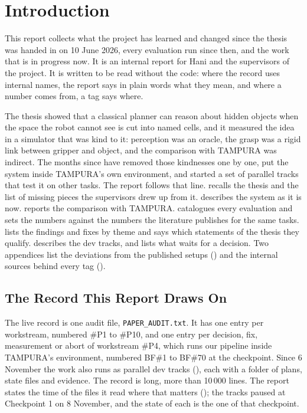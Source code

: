 
\chapter{Introduction}
\label{ch:introduction}

This report collects what the project has learned and changed since the thesis
\cite{alassiri2026thesis} was handed in on 10 June 2026, every evaluation run
since then, and the work that is in progress now. It is an internal report for
Hani and the supervisors of the project. It is written to be read without the code: where the
record uses internal names, the report says in plain words what they mean, and
where a number comes from, a tag says where.

The thesis showed that a classical planner can reason about hidden objects when
the space the robot cannot see is cut into named cells, and it measured the
idea in a simulator that was kind to it: perception was an oracle, the grasp was
a rigid link between gripper and object, and the comparison with TAMPURA
\cite{curtis2024partially} was indirect. The months since have removed those
kindnesses one by one, put the system inside TAMPURA's own environment, and
started a set of parallel tracks that test it on other tasks. The report follows
that line.  recalls the thesis and the list of missing
pieces the supervisors drew up from it.  describes the system
as it is now.  reports the comparison with TAMPURA.
 catalogues every evaluation and sets the numbers against
the numbers the literature publishes for the same tasks. 
lists the findings and fixes by theme and says which statements of the thesis
they qualify.  describes the dev tracks, and
 lists what waits for a decision. Two appendices list
the deviations from the published setups () and the
internal sources behind every tag ().

\section{The Record This Report Draws On}
\label{sec:record}

The live record is one audit file, \texttt{PAPER\_AUDIT.txt}. It has one entry
per workstream, numbered \#P1 to \#P10, and one entry per decision, fix,
measurement or abort of workstream \#P4, which runs our pipeline inside TAMPURA's
environment, numbered BF\#1 to BF\#70 at the checkpoint. Since 6 November the
work also runs as parallel dev tracks (), each with a folder of plans, state
files and evidence. The record is long, more than 10\,000 lines. The report states the
time of the files it read where that matters (); the tracks paused at
Checkpoint 1 on 8 November, and the state of each is the one of that checkpoint.

